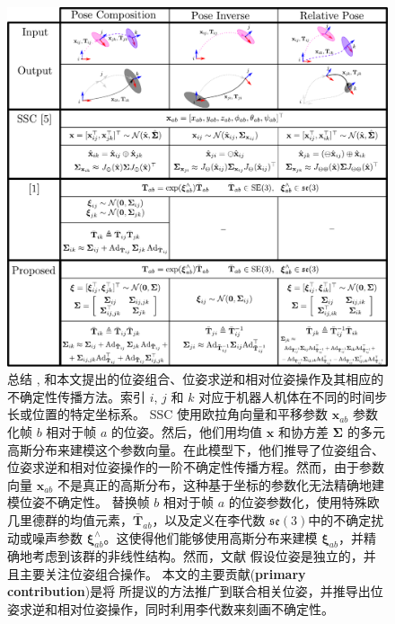 \begin{figure}[t]
    \centering
    \includegraphics[width=\textwidth]{figures/Lie-SSC-Operations-Summary.pdf}
    \caption{
    总结 \citet{smith1990a}, \citet{barfoot2014associating} 和本文提出的位姿组合、位姿求逆和相对位姿操作及其相应的不确定性传播方法。索引 $i$, $j$ 和 $k$ 对应于机器人机体在不同的时间步长或位置的特定坐标系。 
    SSC \cite{smith1990a} 使用欧拉角向量和平移参数 $\mathbf{x}_{ab}$ 参数化帧 $b$ 相对于帧 $a$ 的位姿。然后，他们用均值 $\hat{\mathbf{x}}$ 和协方差 $\boldsymbol{\Sigma}$ 的多元高斯分布来建模这个参数向量。在此模型下，他们推导了位姿组合、位姿求逆和相对位姿操作的一阶不确定性传播方程。然而，由于参数向量 $\mathbf{x}_{ab}$ 不是真正的高斯分布，这种基于坐标的参数化无法精确地建模位姿不确定性。 
    \citet{barfoot2014associating} 替换帧 $b$ 相对于帧 $a$ 的位姿参数化，使用特殊欧几里德群的均值元素，$\bar{\mathbf{T}}_{ab}$，以及定义在李代数 $\mathfrak{se}(3)$中的不确定扰动或噪声参数 $\boldsymbol{\xi}_{ab}^\wedge$。这使得他们能够使用高斯分布来建模 $\boldsymbol{\xi}_{ab}$，并精确地考虑到该群的非线性结构。然而，文献 \cite{barfoot2014associating} 假设位姿是独立的，并且主要关注位姿组合操作。 
    本文的主要贡献(\textbf{primary contribution})是将 \citet{barfoot2014associating} 所提议的方法推广到联合相关位姿，并推导出位姿求逆和相对位姿操作，同时利用李代数来刻画不确定性。} 
    \label{fig:summary}
\end{figure}

